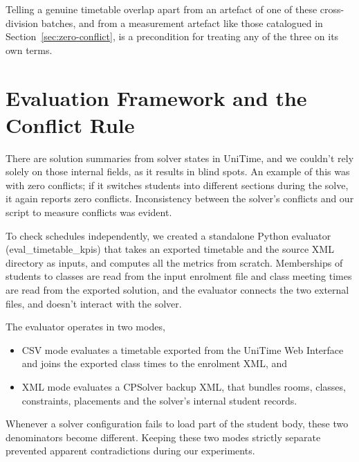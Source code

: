 \documentclass[journal]{IEEEtran}
\begin{document}
Telling a genuine timetable overlap apart from an artefact of one of these cross-division batches, and from a measurement artefact like those catalogued in Section~\ref{sec:zero-conflict}, is a precondition for treating any of the three on its own terms.
\section{Evaluation Framework and the Conflict Rule}

\label{sec:evaluator}

There are solution summaries from solver states in UniTime, and we couldn't rely solely on those internal fields, as it results in blind spots. An example of this was with zero conflicts; if it switches students into different sections during the solve, it again reports zero conflicts. Inconsistency between the solver's conflicts and our script to measure conflicts was evident.

To check schedules independently, we created a standalone Python evaluator (eval\_timetable\_kpis) that takes an exported timetable and the source XML directory as inputs, and computes all the metrics from scratch. Memberships of students to classes are read from the input enrolment file and class meeting times are read from the exported solution, and the evaluator connects the two external files, and doesn't interact with the solver.

The evaluator operates in two modes,
\begin{itemize}
  \item CSV mode evaluates a timetable exported from the UniTime Web Interface and joins the exported class times to the enrolment XML, and
  \item XML mode evaluates a CPSolver backup XML, that bundles rooms, classes, constraints, placements and the solver’s internal student records.
\end{itemize}

Whenever a solver configuration fails to load part of the student body, these two denominators become different. Keeping these two modes strictly separate prevented apparent contradictions during our experiments.
\end{document}
